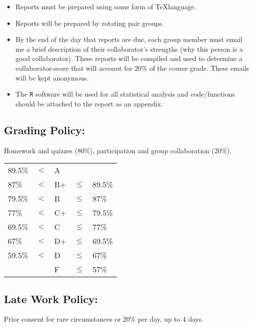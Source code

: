 \documentclass[11pt, a4paper]{article}
\begin{document}
\begin{itemize}
\item Reports must be prepared using some form of \TeX language.
\item Reports will be prepared by rotating pair groups.
\item By the end of the day that reports are due, each group member
  must email me a brief description of their collaborator's strengths
  (why this person is a good collaborator). These reports will be
  compiled and used to determine a collaborator-score that will
  account for 20\% of the course grade. These emails will be kept
  anonymous.
\item The \texttt{R} software will be used for all statistical
  analysis and code/functions should be attached to the report as an
  appendix.
\end{itemize}

\subsection*{Grading Policy:} Homework and quizzes (80\%),
participation and group collaboration (20\%).

\begin{center}
  \begin{tabular}{ lllll }
    89.5\% & $<$ & A  &      &\\ 
    87\%   & $<$ & B+ &$\leq$& 89.5\%\\ 
    79.5\% & $<$ & B  &$\leq$& 87\%\\ 
    77\%   & $<$ & C+ &$\leq$& 79.5\%\\ 
    69.5\% & $<$ & C  &$\leq$& 77\%\\ 
    67\%   & $<$ & D+ &$\leq$& 69.5\%\\ 
    59.5\% & $<$ & D  &$\leq$& 67\%\\
           &     & F  &$\leq$& 57\%\\
  \end{tabular}
\end{center}

\subsection*{Late  Work Policy:}
Prior consent for rare circumstances or 20\% per day, up to 4 days. 
\end{document}
